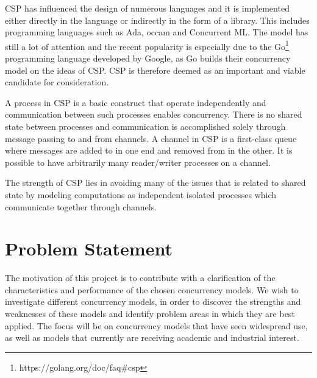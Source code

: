 \ac{CSP} has influenced the design of numerous languages and it is implemented either directly in the language or indirectly in the form of a library. This includes programming languages such as Ada, occam and Concurrent ML\cite{abdallah2005communicating}. The model has still a lot of attention and the recent popularity is especially due to the Go\footnote{https://golang.org/doc/faq\#csp} programming language developed by Google, as Go builds their concurrency model on the ideas of \ac{CSP}\cite[Chap. 6]{sevenModels}. \ac{CSP} is therefore deemed as an important and viable candidate for consideration.

A process in \ac{CSP} is a basic construct that operate independently and communication between such processes enables concurrency\cite{ibmCSP}. There is no shared state between processes and communication is accomplished solely through message passing to and from channels. A channel in \ac{CSP} is a first-class queue where messages are added to in one end and removed from in the other\cite[Chap. 6]{sevenModels}. It is possible to have arbitrarily many reader/writer processes on a channel. 

The strength of \ac{CSP} lies in avoiding many of the issues that is related to shared state by modeling computations as independent isolated processes which communicate together through channels. 


\section{Problem Statement}
The motivation of this project is to contribute with a clarification of the characteristics and performance of the chosen concurrency models. We wish to investigate different concurrency models, in order to discover the strengths and weaknesses of these models and identify problem areas in which they are best applied. The focus will be on concurrency models that have seen widespread use, as well as models that currently are receiving academic and industrial interest.

